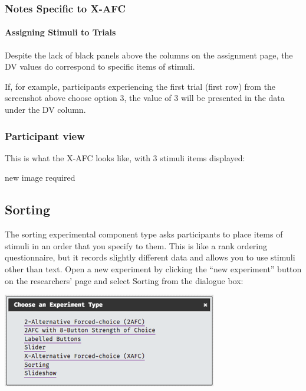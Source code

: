 \documentclass[]{book}
\let\oldparagraph\paragraph
\renewcommand{\paragraph}[1]{\oldparagraph{#1}\mbox{}}
\begin{document}
\subsubsection*{Notes Specific to X-AFC}\label{notes-specific-to-x-afc}

\paragraph{Assigning Stimuli to
Trials}\label{assigning-stimuli-to-trials-2}

Despite the lack of black panels above the columns on the assignment
page, the DV values do correspond to specific items of stimuli.

If, for example, participants experiencing the first trial (first row)
from the screenshot above choose option 3, the value of 3 will be
presented in the data under the DV column.

\subsubsection*{Participant view}\label{participant-view-4}

This is what the X-AFC looks like, with 3 stimuli items displayed:

\begin{warning}
new image required
\end{warning}

\subsection{Sorting}\label{sorting}

The sorting experimental component type asks participants to place items
of stimuli in an order that you specify to them. This is like a rank
ordering questionnaire, but it records slightly different data and
allows you to use stimuli other than text. Open a new experiment by
clicking the ``new experiment'' button on the researchers' page and
select Sorting from the dialogue box:

\includegraphics{images/screenshots/exp_2.png}
\end{document}
